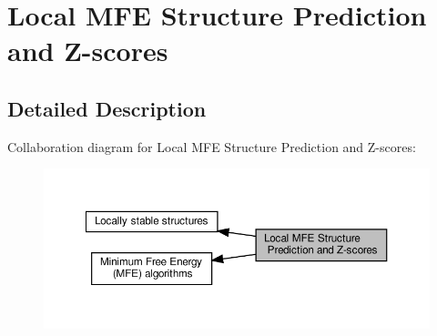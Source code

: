 \hypertarget{group__local__mfe__fold}{}\section{Local M\+FE Structure Prediction and Z-\/scores}
\label{group__local__mfe__fold}


\subsection{Detailed Description}
Collaboration diagram for Local M\+FE Structure Prediction and Z-\/scores\+:
\nopagebreak
\begin{figure}[H]
\begin{center}
\leavevmode
\includegraphics[width=350pt]{group__local__mfe__fold}
\end{center}
\end{figure}
